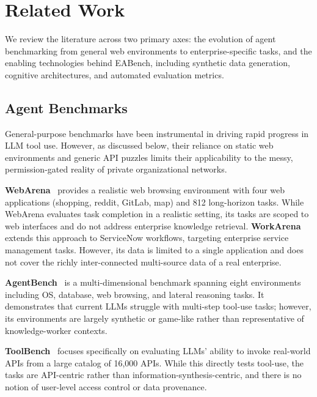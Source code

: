 \documentclass[journal,dvipsnames]{acmart}
\begin{document}
\section{Related Work}
\label{sec:related}

We review the literature across two primary axes: the evolution of agent benchmarking from general web environments to enterprise-specific tasks, and the enabling technologies behind EABench, including synthetic data generation, cognitive architectures, and automated evaluation metrics.

\subsection{Agent Benchmarks}

General-purpose benchmarks have been instrumental in driving rapid progress in LLM tool use. However, as discussed below, their reliance on static web environments and generic API puzzles limits their applicability to the messy, permission-gated reality of private organizational networks.

\textbf{WebArena}~\cite{zhou2023webarena} provides a realistic web browsing
environment with four web applications (shopping, reddit, GitLab, map) and 812
long-horizon tasks.  While WebArena evaluates task completion in a realistic
setting, its tasks are scoped to web interfaces and do not address enterprise
knowledge retrieval.  \textbf{WorkArena}~\cite{drouin2024workarena} extends
this approach to ServiceNow workflows, targeting enterprise service management
tasks.  However, its data is limited to a single application and does not cover
the richly inter-connected multi-source data of a real enterprise.

\textbf{AgentBench}~\cite{liu2023agentbench} is a multi-dimensional benchmark
spanning eight environments including OS, database, web browsing, and lateral
reasoning tasks.  It demonstrates that current LLMs struggle with multi-step
tool-use tasks; however, its environments are largely synthetic or game-like
rather than representative of knowledge-worker contexts.

\textbf{ToolBench}~\cite{qin2023toolllm} focuses specifically on evaluating
LLMs' ability to invoke real-world APIs from a large catalog of 16,000 APIs.
While this directly tests tool-use, the tasks are API-centric rather than
information-synthesis-centric, and there is no notion of user-level access
control or data provenance.
\end{document}
